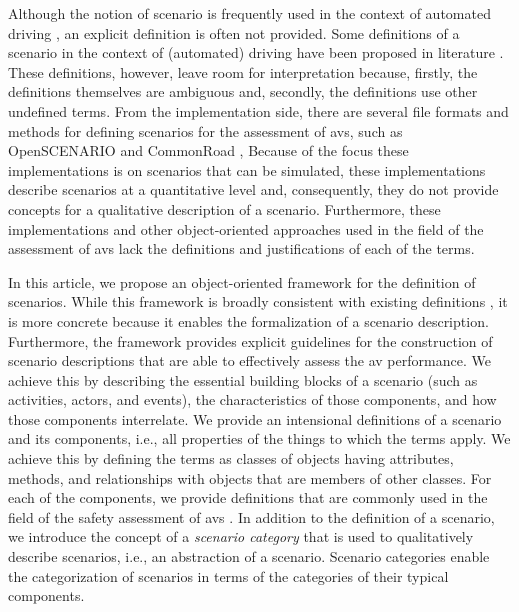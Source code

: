 Although the notion of scenario is frequently used in the context of automated driving \autocite{gietelink2006development, ebner2011identifying, hulshof2013autonomous, xiong2015orchestration, zofka2015datadrivetrafficscenarios, putz2017pegasus, roesener2017comprehensive, ploeg2017GCDC, shao2019evaluating}, an explicit definition is often not provided. \cendc
Some definitions of a scenario in the context of (automated) driving have been proposed in literature \autocite{geyer2014, ulbrich2015, elrofai2016scenario}.
These definitions, however, leave room for interpretation because, firstly, the definitions themselves are ambiguous and, secondly, the definitions use other undefined terms.
\cstartc From the implementation side, there are several file formats and methods for defining scenarios for the assessment of \acp{av}, such as OpenSCENARIO \autocite{openscenario} and CommonRoad \autocite{althoff2017CommonRoad},
Because of the focus these implementations is on scenarios that can be simulated, these implementations describe scenarios at a quantitative level and, consequently, they do not provide concepts for a qualitative description of a scenario.
Furthermore, these implementations and other object-oriented approaches used in the field of the assessment of \acp{av} \autocite{tsai2003scenario, utting2012taxonomy, zofka2016testing, wittmann2017method} lack the definitions and justifications of each of the terms.

In this article, we propose an object-oriented framework for the definition of scenarios. While this framework is broadly consistent with existing definitions \autocite{geyer2014, ulbrich2015, elrofai2016scenario}, it is more concrete because it enables the formalization of a scenario description. 
Furthermore, the framework provides explicit guidelines for the construction of scenario descriptions that are able to effectively assess the \ac{av} performance.
We achieve this by describing the essential building blocks of a scenario (such as activities, actors, and events), the characteristics of those components, and how those components interrelate. 
We provide an intensional definitions of a scenario and its components, i.e., all properties of the things to which the terms apply. We achieve this by defining the terms as classes of objects having attributes, methods, and relationships with objects that are members of other classes.
For each of the components, we provide definitions that are commonly used in the field of the safety assessment of \acp{av} \autocite{geyer2014, ulbrich2015, catapult2018musicc, catapult2018regulating, sigsim2019glossary, openscenario}. 
In addition to the definition of a scenario, we introduce the concept of a \emph{scenario category} that is used to qualitatively describe scenarios, i.e., an abstraction of a scenario. Scenario categories enable the categorization of scenarios in terms of the categories of their typical components.

